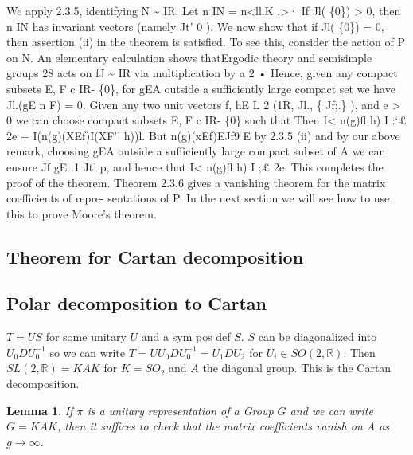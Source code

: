 \documentclass[
  12pt
]{article}
\theoremstyle{break}
\theoremstyle{plain}
\newtheorem{lem}[thm]{Lemma}
\begin{document}
   We apply 2.3.5, identifying N \textasciitilde{}
  IR. Let n IN = n\textless ll.K ,\textgreater· If Jl( \{0\})
  \textgreater{} 0, then n IN has invariant vectors (namely Jt' 0 ). We
  now show that if Jl( \{0\}) = 0, then assertion (ii) in the theorem is
  satisfied. To see this, consider the action of P on N. An elementary
  calculation shows thatErgodic theory and semisimple groups 28 acts on fJ
  \textasciitilde{} IR via multiplication by a 2 • Hence, given any
  compact subsets E, F c IR- \{0\}, for gEA outside a sufficiently large
  compact set we have Jl.(gE n F) = 0. Given any two unit vectors f, hE L
  2 (1R, Jl., \{ Jf;.\} ), and e \textgreater{} 0 we can choose compact
  subsets E, F c IR- \{0\} such that Then I\textless{} n(g)fl h) I :`£ 2e
  + I(n(g)(XEf)I(XF'' h))l. But n(g)(xEf)EJf9 E by 2.3.5 (ii) and by our
  above remark, choosing gEA outside a sufficiently large compact subset
  of A we can ensure Jf gE .1 Jt' p, and hence that I\textless{} n(g)fl h)
  I ;£ 2e. This completes the proof of the theorem. Theorem 2.3.6 gives a
  vanishing theorem for the matrix coefficients of repre- sentations of P.
  In the next section we will see how to use this to prove Moore's
  theorem.




  \hypertarget{theorem-for-cartan-decomposition}{%
  \subsection{Theorem for Cartan
  decomposition}\label{theorem-for-cartan-decomposition}}

  \hypertarget{polar-decomposition-to-cartan}{%
  \subsection{Polar decomposition to
  Cartan}\label{polar-decomposition-to-cartan}}

  $T = US$ for some unitary $U$ and a sym pos def $S$. $S$ can be
  diagonalized into $U_0 D U_0^{-1}$ so we can write
  $T = U U_0 D U_0^{-1} = U_1 D U_2$ for $U_i \in SO(2, \mathbb{R})$.
  Then $SL(2, \mathbb{R}) = KAK$ for $K = SO_2$ and $A$ the diagonal
  group. This is the Cartan decomposition.





  \begin{lem}\label{lemma}
  If $\pi$ is a unitary representation of a Group $G$ and we can write
  $G = KAK$, then it suffices to check that the matrix coefficients
  vanish on A as $g \rightarrow \infty$.
  \end{lem}
\end{document}
